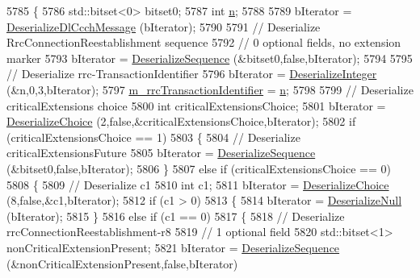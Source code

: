 \begin{DoxyCode}
5785 \{
5786   std::bitset<0> bitset0;
5787   \textcolor{keywordtype}{int} \hyperlink{namespacesample-rng-plot_aeb5ee5c431e338ef39b7ac5431242e1d}{n};
5788 
5789   bIterator = \hyperlink{classns3_1_1RrcDlCcchMessage_a113d0d3c8e4cf337e3bc555c20079aff}{DeserializeDlCcchMessage} (bIterator);
5790 
5791   \textcolor{comment}{// Deserialize RrcConnectionReestablishment sequence}
5792   \textcolor{comment}{// 0 optional fields, no extension marker}
5793   bIterator = \hyperlink{classns3_1_1Asn1Header_a58c68bb97ba3fe2e8fcdd7c208d672b2}{DeserializeSequence} (&bitset0,\textcolor{keyword}{false},bIterator);
5794 
5795   \textcolor{comment}{// Deserialize rrc-TransactionIdentifier}
5796   bIterator = \hyperlink{classns3_1_1Asn1Header_a49802c9af30018b078150e866b6ecae2}{DeserializeInteger} (&n,0,3,bIterator);
5797   \hyperlink{classns3_1_1RrcConnectionReestablishmentHeader_a0076e23c53a65fe3c18a95c6d4d007c7}{m\_rrcTransactionIdentifier} = \hyperlink{namespacesample-rng-plot_aeb5ee5c431e338ef39b7ac5431242e1d}{n};
5798 
5799   \textcolor{comment}{// Deserialize criticalExtensions choice}
5800   \textcolor{keywordtype}{int} criticalExtensionsChoice;
5801   bIterator = \hyperlink{classns3_1_1Asn1Header_a0af5881f07a0549a8693a1b75c229a90}{DeserializeChoice} (2,\textcolor{keyword}{false},&criticalExtensionsChoice,bIterator);
5802   \textcolor{keywordflow}{if} (criticalExtensionsChoice == 1)
5803     \{
5804       \textcolor{comment}{// Deserialize criticalExtensionsFuture}
5805       bIterator = \hyperlink{classns3_1_1Asn1Header_a58c68bb97ba3fe2e8fcdd7c208d672b2}{DeserializeSequence} (&bitset0,\textcolor{keyword}{false},bIterator);
5806     \}
5807   \textcolor{keywordflow}{else} \textcolor{keywordflow}{if} (criticalExtensionsChoice == 0)
5808     \{
5809       \textcolor{comment}{// Deserialize c1}
5810       \textcolor{keywordtype}{int} c1;
5811       bIterator = \hyperlink{classns3_1_1Asn1Header_a0af5881f07a0549a8693a1b75c229a90}{DeserializeChoice} (8,\textcolor{keyword}{false},&c1,bIterator);
5812       \textcolor{keywordflow}{if} (c1 > 0)
5813         \{
5814           bIterator = \hyperlink{classns3_1_1Asn1Header_a29bd4508f3f1ef636b3480f524fac0ce}{DeserializeNull} (bIterator);
5815         \}
5816       \textcolor{keywordflow}{else} \textcolor{keywordflow}{if} (c1 == 0)
5817         \{
5818           \textcolor{comment}{// Deserialize rrcConnectionReestablishment-r8}
5819           \textcolor{comment}{// 1 optional field}
5820           std::bitset<1> nonCriticalExtensionPresent;
5821           bIterator = \hyperlink{classns3_1_1Asn1Header_a58c68bb97ba3fe2e8fcdd7c208d672b2}{DeserializeSequence} (&nonCriticalExtensionPresent,\textcolor{keyword}{false},bIterator)

\end{DoxyCode}
